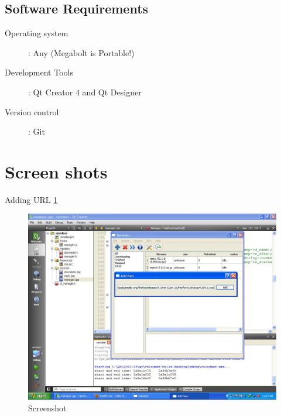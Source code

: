\documentclass[pdftex,12pt,a4paper,pdfencoding=unicode]{article}
\begin{document}
\begin{onehalfspace}
       \subsection{Software Requirements}
       \begin{description}
       \item[ Operating system ]: Any (Megabolt is Portable!)
       \item[ Development Tools]: Qt Creator 4 and Qt Designer
       \item[Version control] : Git
       \end{description}
       \newpage
       \section{Screen shots}
       Adding URL \ref{fig:ss2}
       \begin{figure}[h!]
         \includegraphics[scale=0.60]{pic/ss2.jpg}
         \caption{Screenshot \label{fig:ss2}}
       \end{figure}
       \newpage

\end{onehalfspace}
\end{document}
